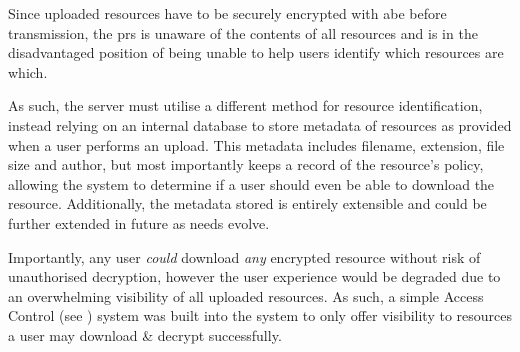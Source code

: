 Since uploaded resources have to be securely encrypted with \acrshort{abe} before transmission, the \acrfull{prs} is unaware of the contents of all resources and is in the disadvantaged position of being unable to help users identify which resources are which.

As such, the server must utilise a different method for resource identification, instead relying on an internal database to store metadata of resources as provided when a user performs an upload. This metadata includes filename, extension, file size and author, but most importantly keeps a record of the resource's policy, allowing the system to determine if a user should even be able to download the resource. Additionally, the metadata stored is entirely extensible and could be further extended in future as needs evolve.

Importantly, any user \textit{could} download \textit{any} encrypted resource without risk of unauthorised decryption, however the user experience would be degraded due to an overwhelming visibility of all uploaded resources. As such, a simple Access Control (see ) system was built into the system to only offer visibility to resources a user may download \& decrypt successfully.

